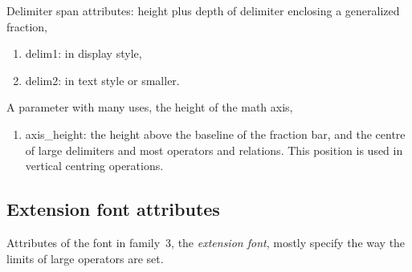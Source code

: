 Delimiter span attributes: height plus depth of delimiter enclosing
a generalized fraction,
\begin{enumerate} %
\item delim1:
in display style,
\item delim2:
in text style or smaller.
\end{enumerate}

A parameter with many uses, the height of the math axis,
\begin{enumerate} %
\item axis\_height:
the height above the baseline
of the fraction bar, and the centre of large delimiters
and most operators and relations. This position is
used in vertical centring operations.
\end{enumerate}


\subsection{Extension font attributes}


Attributes of the font in family~3, the \emph{extension font},
mostly specify
the way the limits of large operators are set.


